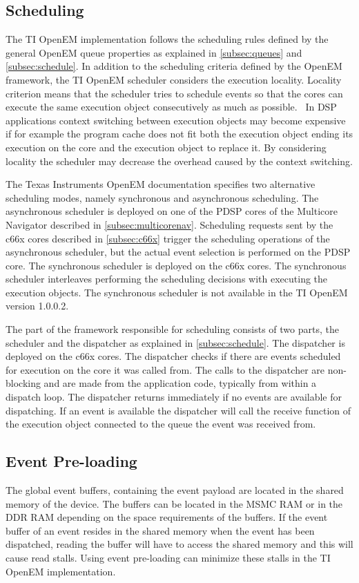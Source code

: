 \subsection{Scheduling}
\label{subsec:ti-scheduling}
The TI OpenEM implementation follows the scheduling rules defined by the general OpenEM queue properties as explained in \ref{subsec:queues} and \ref{subsec:schedule}. In addition to the scheduling criteria defined by the OpenEM framework, the TI OpenEM scheduler considers the execution locality. Locality criterion means that the scheduler tries to schedule events so that the cores can execute the same execution object consecutively as much as possible.~\cite{moerman2014open} In DSP applications context switching between execution objects may become expensive if for example the program cache does not fit both the execution object ending its execution on the core and the execution object to replace it. By considering locality the scheduler may decrease the overhead caused by the context switching.

The Texas Instruments OpenEM documentation specifies two alternative scheduling modes, namely synchronous and asynchronous scheduling. The asynchronous scheduler is deployed on one of the PDSP cores of the Multicore Navigator described in \ref{subsec:multicorenav}. Scheduling requests sent by the c66x cores described in \ref{subsec:c66x} trigger the scheduling operations of the asynchronous scheduler, but the actual event selection is performed on the PDSP core. The synchronous scheduler is deployed on the c66x cores. The synchronous scheduler interleaves performing the scheduling decisions with executing the execution objects. The synchronous scheduler is not available in the TI OpenEM version 1.0.0.2.~\cite{moerman2014open}

The part of the framework responsible for scheduling consists of two parts, the scheduler and the dispatcher as explained in \ref{subsec:schedule}. The dispatcher is deployed on the c66x cores. The dispatcher checks if there are events scheduled for execution on the core it was called from. The calls to the dispatcher are non-blocking and are made from the application code, typically from within a dispatch loop. The dispatcher returns immediately if no events are available for dispatching. If an event is available the dispatcher will call the receive function of the execution object connected to the queue the event was received from.~\cite{moerman2014open}

\subsection{Event Pre-loading}
\label{subsec:ti-preloading}
The global event buffers, containing the event payload are located in the shared memory of the device. The buffers can be located in the MSMC RAM or in the DDR RAM depending on the space requirements of the buffers. If the event buffer of an event resides in the shared memory when the event has been dispatched, reading the buffer will have to access the shared memory and this will cause read stalls. Using event pre-loading can minimize these stalls in the TI OpenEM implementation.~\cite{moerman2014open}

